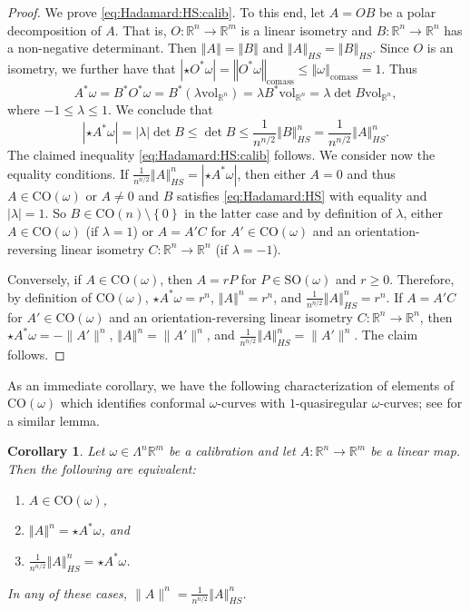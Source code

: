 \documentclass[a4paper,leqno,11pt]{amsart}
\numberwithin{equation}{section}
\newtheorem{corollary}[theorem]{Corollary}
\theoremstyle{remark}
\theoremstyle{remark}
\newcommand{\R}{\mathbb{R}}
\newcommand{\norm}[1]{ \left\Vert #1 \right\Vert }	%
\newcommand{\vol}{\mathrm{vol}}
\newcommand{\comass}{\mathrm{comass}}
\newcommand{\SO}{\mathrm{SO}}
\newcommand{\CO}{\mathrm{CO}}
\begin{document}
\begin{proof}
We prove \eqref{eq:Hadamard:HS:calib}. To this end, let $A = O B$ be a polar decomposition of $A$. That is, $O \colon \R^n \to \R^m$ is a linear isometry and $B \colon \R^n \to \R^n$ has a non-negative determinant. Then $\norm{A} = \norm{B}$ and $\norm{A}_{HS} = \norm{B}_{HS}$. Since $O$ is an isometry, we further have that $|\star O^*\omega| = \norm{O^*\omega}_{\comass} \le \norm{\omega}_\comass = 1$. Thus 
\[
A^*\omega = B^* O^*\omega = B^* (\lambda \vol_{\R^n}) = \lambda B^*\vol_{\R^n} = \lambda \det B \vol_{\R^n},
\]
where $-1 \le \lambda \le 1$. We conclude that
\[
|\star A^{*}\omega| = |\lambda| \det B  \leq \det B
\le \frac{1}{n^{n/2}} \norm{B}_{HS}^n
= \frac{1}{n^{n/2}} \norm{A}_{HS}^n.
\]
The claimed inequality \eqref{eq:Hadamard:HS:calib} follows. We consider now the equality conditions. If $\frac{1}{n^{n/2}}\norm{A}_{HS}^n = |\star A^{*}\omega|$, then either $A = 0$ and thus $A \in \CO( \omega )$ or $A \neq 0$ and $B$ satisfies \eqref{eq:Hadamard:HS} with equality and $|\lambda|=1$. So $B \in \CO(n) \setminus \left\{0\right\}$ in the latter case and by definition of $\lambda$, either $A \in \CO( \omega )$ (if $\lambda = 1$) or $A = A' C$ for $A' \in \CO( \omega )$ and an orientation-reversing linear isometry $C \colon \R^n \to \R^n$ (if $\lambda = -1$).

Conversely, if $A \in \CO( \omega )$, then $A = r P$ for $P \in \SO( \omega )$ and $r \geq 0$. Therefore, by definition of $\CO(\omega)$, $\star A^{*}\omega = r^n$, $\norm{A}^n = r^n$, and $\frac{1}{n^{n/2}} \norm{A}_{HS}^n = r^n$. If $A = A' C$ for $A' \in \CO( \omega )$ and an orientation-reversing linear isometry $C \colon \R^n \to \R^n$, then $\star A^{*}\omega = -\|A'\|^n$, $\norm{A}^n = \|A'\|^n$, and $\frac{1}{n^{n/2}} \norm{A}_{HS}^n = \|A'\|^n$. The claim follows.
\end{proof}

As an immediate corollary, we have the following characterization of elements of $\CO(\omega)$ which identifies conformal $\omega$-curves with $1$-quasiregular $\omega$-curves; see \cite[Lemma 4.1]{Hei:Pan:Pry:23} for a similar lemma.

\begin{corollary}
\label{cor:LA}
Let $\omega \in \Lambda^n \R^m$ be a calibration and let $A\colon \R^n \to \R^m$ be a linear map. Then the following are equivalent:
\begin{enumerate}
\item $A \in \CO(\omega)$,\label{item:LA-1}
\item $\norm{A}^n= \star A^*\omega$, and \label{item:LA-2}
\item $\frac{1}{n^{n/2}} \norm{A}_{HS}^n = \star A^*\omega$. \label{item:LA-3}
\end{enumerate}
In any of these cases, $\|A\|^n = \frac{1}{n^{n/2}} \norm{A}_{HS}^n$.
\end{corollary}
\end{document}
